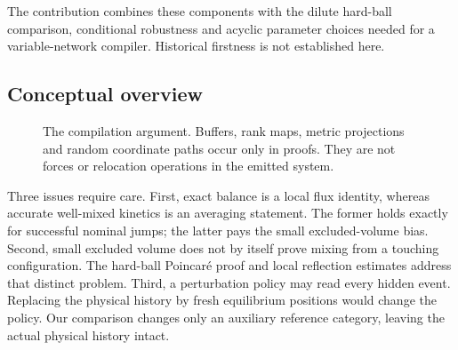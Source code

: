 \documentclass[11pt]{article}
\numberwithin{equation}{section}
\theoremstyle{definition}
\theoremstyle{remark}\newtheorem{remark}[theorem]{Remark}
\begin{document}
The contribution combines these components with the dilute hard-ball
comparison, conditional robustness and acyclic parameter choices needed for
a variable-network compiler. Historical firstness is not established here.

\clearpage
\subsection{Conceptual overview}
\label{sec:overview}

\begin{figure}[htbp]
\centering



\caption{The compilation argument. Buffers, rank maps, metric projections
and random coordinate paths occur only in proofs. They are not forces or
relocation operations in the emitted system.}
\label{fig:pipeline}
\end{figure}

Three issues require care. First, exact balance is a local flux identity,
whereas accurate well-mixed kinetics is an averaging statement. The former
holds exactly for successful nominal jumps; the latter pays the small
excluded-volume bias. Second, small excluded volume does not by itself prove
mixing from a touching configuration. The hard-ball Poincar\'e proof and local
reflection estimates address that distinct problem. Third, a perturbation
policy may read every hidden event. Replacing the physical history by fresh
equilibrium positions would change the policy. Our comparison changes only
an auxiliary reference category, leaving the actual physical history intact.
\end{document}
